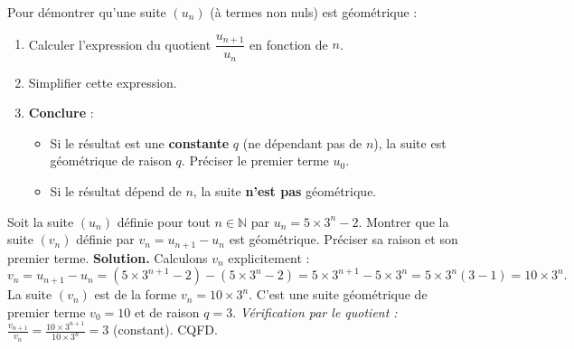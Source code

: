 \documentclass[11pt]{article}
\begin{document}
\begin{methode}
Pour démontrer qu'une suite $(u_n)$ (à termes non nuls) est géométrique :
\begin{enumerate}
    \item Calculer l'expression du quotient $\dfrac{u_{n+1}}{u_n}$ en fonction de $n$.
    \item Simplifier cette expression.
    \item \textbf{Conclure} :
    \begin{itemize}
        \item Si le résultat est une \textbf{constante} $q$ (ne dépendant pas de $n$), la suite est géométrique de raison $q$. Préciser le premier terme $u_0$.
        \item Si le résultat dépend de $n$, la suite \textbf{n'est pas} géométrique.
    \end{itemize}
\end{enumerate}
\end{methode}

\begin{exoresolu}
Soit la suite $(u_n)$ définie pour tout $n \in \mathbb{N}$ par $u_n = 5 \times 3^n - 2$.
Montrer que la suite $(v_n)$ définie par $v_n = u_{n+1} - u_n$ est géométrique. Préciser sa raison et son premier terme.
\tcblower
\textbf{Solution.}
Calculons $v_n$ explicitement :
\[
v_n = u_{n+1} - u_n = (5 \times 3^{n+1} - 2) - (5 \times 3^n - 2) = 5 \times 3^{n+1} - 5 \times 3^n = 5 \times 3^n(3 - 1) = 10 \times 3^n.
\]
La suite $(v_n)$ est de la forme $v_n = 10 \times 3^n$. C'est une suite géométrique de premier terme $v_0 = 10$ et de raison $q = 3$.
\textit{Vérification par le quotient :} $\frac{v_{n+1}}{v_n} = \frac{10 \times 3^{n+1}}{10 \times 3^n} = 3$ (constant). CQFD.
\end{exoresolu}
\end{document}
